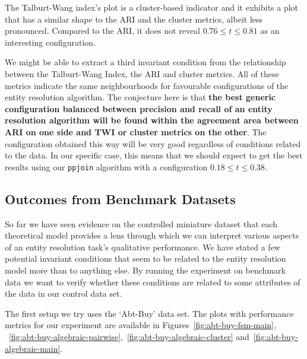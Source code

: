 The Talburt-Wang index's plot is a cluster-based indicator and it exhibits a
plot that has a similar shape to the ARI and the cluster metrics, albeit less
pronounced.
Compared to the ARI, it does not reveal $0.76 \le t \le 0.81$ as an interesting
configuration.

We might be able to extract a third invariant condition from the relationship
between the Talburt-Wang Index, the ARI and cluster metrics.
All of these metrics indicate the same neighbourhoods for favourable
configurations of the entity resolution algorithm.
The conjecture here is that \textbf{the best generic configuration balanced
between precision and recall of an entity resolution algorithm will be found
within the agreement area between ARI on one side and TWI or cluster metrics on
the other}.
The configuration obtained this way will be very good regardless of conditions
related to the data.
In our specific case, this means that we should expect to get the best results
using our \texttt{ppjoin} algorithm with a configuration $0.18 \le t \le 0.38$.

\subsection{Outcomes from Benchmark Datasets}\label{subsec:experiment-benchmark}

So far we have seen evidence on the controlled miniature dataset that each
theoretical model provides a lens through which we can interpret various aspects
of an entity resolution task's qualitative performance.
We have stated a few potential invariant conditions that seem to be related to
the entity resolution model more than to anything else.
By running the experiment on benchmark data we want to verify whether these
conditions are related to some attributes of the data in our control data set.

The first setup we try uses the `Abt-Buy' data set.
The plots with performance metrics for our experiment are available in Figures~\ref{fig:abt-buy-fsm-main},
~\ref{fig:abt-buy-algebraic-pairwise},~\ref{fig:abt-buy-algebraic-cluster}
and~\ref{fig:abt-buy-algebraic-main}.

